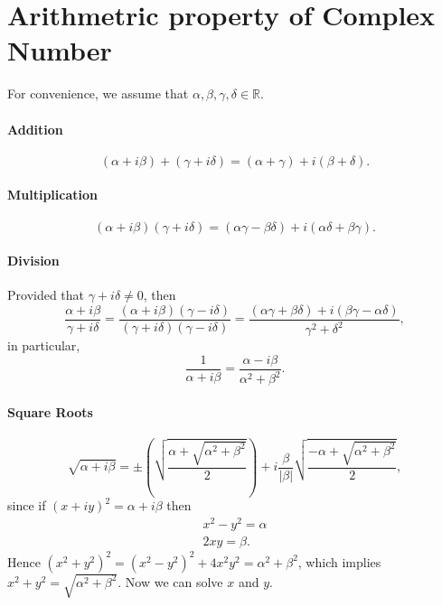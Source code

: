

\section{Arithmetric property of Complex Number}
For convenience, we assume that \( \alpha, \beta, \gamma, \delta \in \mathbb{R} \).
\paragraph{Addition}
\[
  (\alpha + i\beta) + (\gamma + i \delta) = (\alpha + \gamma) + i(\beta + \delta).
\]
\paragraph{Multiplication}
\[
  (\alpha + i\beta)(\gamma + i\delta) = (\alpha \gamma - \beta \delta) + i(\alpha \delta + \beta \gamma).
\]
\paragraph{Division}
Provided that \( \gamma + i \delta \neq 0 \), then
\[
  \frac{\alpha + i\beta}{\gamma + i\delta} = \frac{(\alpha + i\beta)(\gamma - i\delta)}{(\gamma + i\delta)(\gamma - i\delta)} = \frac{(\alpha \gamma + \beta \delta) + i(\beta \gamma - \alpha \delta)}{\gamma^2 + \delta^2},
\]
in particular,
\[
  \frac{1}{\alpha + i\beta} = \frac{\alpha - i\beta}{\alpha^2 + \beta^2}.
\]
\paragraph{Square Roots}
\[
  \sqrt{\alpha + i\beta} = \pm \left( \sqrt{\frac{\alpha + \sqrt{\alpha^2 + \beta^2}}{2}} \right) + i \frac{\beta}{\left\lvert \beta \right\rvert}\sqrt{\frac{-\alpha + \sqrt{\alpha^2 + \beta^2}}{2}},
\]
since if \( (x + iy)^2 = \alpha + i \beta \) then
\begin{align*}
  x^2 - y^2 = \alpha\\ 2xy = \beta.
\end{align*}
Hence \( (x^2 + y^2)^2 = (x^2 - y^2)^2 + 4x^2y^2 = \alpha^2 + \beta^2 \), which implies \( x^2 + y^2 = \sqrt{\alpha^2 + \beta^2} \).
Now we can solve \( x \) and \( y \).
